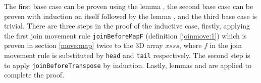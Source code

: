 \documentclass{l4proj}
\begin{document}
\begin{code}
\AgdaSymbol{(}\AgdaSpace{}%
\AgdaSymbol{(}\AgdaSpace{}%
\AgdaSymbol{)}\AgdaSpace{}%
\AgdaSymbol{))}\AgdaSpace{}%
\<%
\\
\>[2][@{}l@{\AgdaIndent{0}}]%
\>[4]\AgdaSpace{}%
\AgdaSymbol{(}\AgdaSpace{}%
\AgdaSymbol{(}\AgdaSpace{}%
\AgdaSymbol{)}\AgdaSpace{}%
\AgdaSymbol{)}\AgdaSpace{}%
\<%
\\
%
\>[4]\AgdaSpace{}%
\AgdaSpace{}%
\AgdaSymbol{(}\AgdaSpace{}%
\AgdaSymbol{(}\AgdaSpace{}%
\AgdaSpace{}%
\AgdaSymbol{(}\AgdaSpace{}%
\AgdaSymbol{(}\AgdaSpace{}%
\AgdaSymbol{)}\AgdaSpace{}%
\AgdaSymbol{)))}\<%
\\
%
\>[2]%
\>[550I]\AgdaSpace{}%
\AgdaSpace{}%
\AgdaSpace{}%
\AgdaSpace{}%
\AgdaSpace{}%
\AgdaSpace{}%
\AgdaSpace{}%
\AgdaSpace{}%
\AgdaSpace{}%
\AgdaSpace{}%
\AgdaSymbol{(}\AgdaSpace{}%
\AgdaSymbol{))}\<%
\\
\>[.][@{}l@{}]\<[550I]%
\>[5]\AgdaSymbol{(}\AgdaSpace{}%
\AgdaSymbol{)}\AgdaSpace{}%
\AgdaSymbol{(}\AgdaSpace{}%
\AgdaSymbol{)}\AgdaSpace{}%
\<%
\\
\>[2][@{}l@{\AgdaIndent{0}}]%
\>[4]\<%
\end{code}
The first base case can be proven using the lemma , the second base case can be proven with induction on itself followed by the lemma , and the third base case is trivial. There are three steps in the proof of the inductive case, firstly, applying the first join movement rule \texttt{joinBeforeMapF} (definition \ref{joinmove:1}) which is proven in section \ref{move:map} twice to the 3D array $xsss$, where $f$ in the join movement rule is substituted by \texttt{head} and \texttt{tail} respectively. The second step is to apply \texttt{joinBeforeTranspose} by induction. Lastly, lemmas  and  are applied to complete the proof. 
\end{document}
